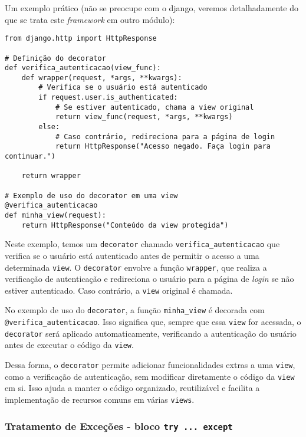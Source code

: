 \documentclass[a4paper, 12pt, onecolumn,singlespacing]{article}
\begin{document}
Um exemplo prático (não se preocupe com o django, veremos detalhadamente do que se trata este \textit{framework} em outro módulo):

\begin{verbatim}
from django.http import HttpResponse

# Definição do decorator
def verifica_autenticacao(view_func):
	def wrapper(request, *args, **kwargs):
		# Verifica se o usuário está autenticado
		if request.user.is_authenticated:
			# Se estiver autenticado, chama a view original
			return view_func(request, *args, **kwargs)
		else:
			# Caso contrário, redireciona para a página de login
			return HttpResponse("Acesso negado. Faça login para continuar.")

	return wrapper

# Exemplo de uso do decorator em uma view
@verifica_autenticacao
def minha_view(request):
	return HttpResponse("Conteúdo da view protegida")
\end{verbatim}

Neste exemplo, temos um \texttt{decorator} chamado \texttt{verifica\_autenticacao} que verifica se o usuário está autenticado antes de permitir o acesso a uma determinada \texttt{view}. O \texttt{decorator} envolve a função \texttt{wrapper}, que realiza a verificação de autenticação e redireciona o usuário para a página de \textit{login} se não estiver autenticado. Caso contrário, a \texttt{view} original é chamada.

No exemplo de uso do \texttt{decorator}, a função \texttt{minha\_view} é decorada com \texttt{@verifica\_autenticacao}. Isso significa que, sempre que essa \texttt{view} for acessada, o \texttt{decorator} será aplicado automaticamente, verificando a autenticação do usuário antes de executar o código da \texttt{view}.

Dessa forma, o \texttt{decorator} permite adicionar funcionalidades extras a uma \texttt{view}, como a verificação de autenticação, sem modificar diretamente o código da \texttt{view} em si. Isso ajuda a manter o código organizado, reutilizável e facilita a implementação de recursos comuns em várias \texttt{views}.

	\subsubsection{Tratamento de Exceções - bloco \texttt{try ... except}}
	
\end{document}
